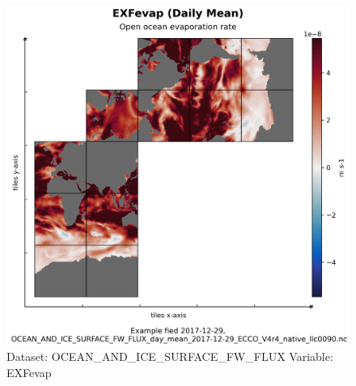 \begin{figure}[H]
\centering
\includegraphics[scale=0.55]{../images/plots/native_plots/Ocean_and_Sea-Ice_Surface_Freshwater_Fluxes/EXFevap.png}
\caption{Dataset: OCEAN\_AND\_ICE\_SURFACE\_FW\_FLUX Variable: EXFevap}
\label{tab:table-OCEAN_AND_ICE_SURFACE_FW_FLUX_EXFevap-Plot}
\end{figure}
\pagebreak
